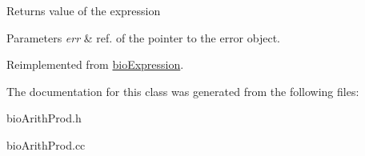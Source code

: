 \begin{DoxyReturn}{Returns}
value of the expression 
\end{DoxyReturn}

\begin{DoxyParams}{Parameters}
{\em err} & ref. of the pointer to the error object. \\
\hline
\end{DoxyParams}


Reimplemented from \hyperlink{classbio_expression_af58662a5d4d456f15bc4f2c9bd4f8a5b}{bio\+Expression}.



The documentation for this class was generated from the following files\+:\begin{DoxyCompactItemize}
\item 
bio\+Arith\+Prod.\+h\item 
bio\+Arith\+Prod.\+cc\end{DoxyCompactItemize}
